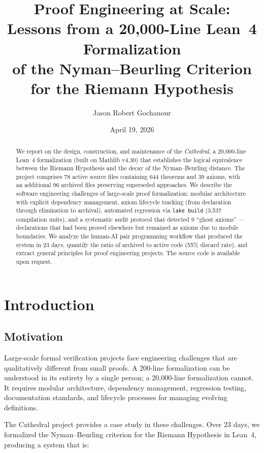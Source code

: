 \documentclass[11pt,a4paper]{article}
\title{%
  Proof Engineering at Scale:\\
  Lessons from a 20,000-Line Lean~4 Formalization\\
  of the Nyman--Beurling Criterion for the Riemann Hypothesis%
}
\author{
  Jason Robert Gochanour
}
\date{April 19, 2026}
\theoremstyle{definition}
\begin{document}
\maketitle

\begin{abstract}
We report on the design, construction, and maintenance of the
\emph{Cathedral}, a 20,000-line Lean~4 formalization (built on
Mathlib v4.30) that establishes the logical equivalence between
the Riemann Hypothesis and the decay of the Nyman--Beurling
distance. The project comprises 78 active source files containing
644 theorems and 39 axioms, with an additional 96 archived files
preserving superseded approaches. We describe the software
engineering challenges of large-scale proof formalization:
modular architecture with explicit dependency management, axiom
lifecycle tracking (from declaration through elimination to
archival), automated regression via \texttt{lake build} (3,537
compilation units), and a systematic audit protocol that detected
9 ``ghost axioms'' --- declarations that had been proved elsewhere
but remained as axioms due to module boundaries. We analyze the
human-AI pair programming workflow that produced the system in 23
days, quantify the ratio of archived to active code (55\%
discard rate), and extract general principles for proof engineering
projects. The source code is available upon request.
\end{abstract}

\tableofcontents

\section{Introduction}

\subsection{Motivation}

Large-scale formal verification projects face engineering challenges
that are qualitatively different from small proofs. A 200-line
formalization can be understood in its entirety by a single person;
a 20,000-line formalization cannot. It requires modular architecture,
dependency management, regression testing, documentation standards,
and lifecycle processes for managing evolving definitions.

The Cathedral project provides a case study in these challenges. Over
23 days, we formalized the Nyman--Beurling criterion for the Riemann
Hypothesis in Lean~4, producing a system that is:
\end{document}
